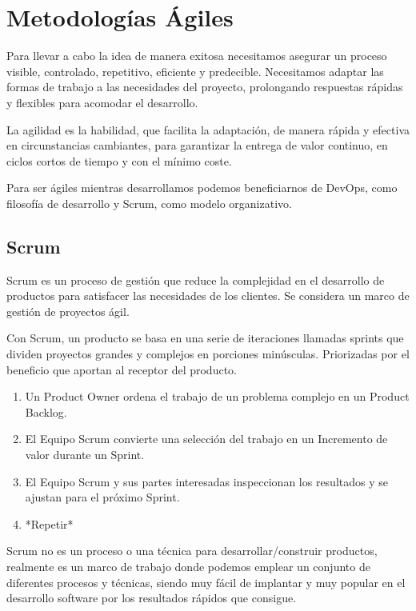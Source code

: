 \documentclass[12pt,twoside,titlepage]{report}
\begin{document}
\section{Metodologías Ágiles}

Para llevar a cabo la idea de manera exitosa necesitamos asegurar un proceso visible, controlado, repetitivo, eficiente y predecible. Necesitamos adaptar las formas de trabajo a las necesidades del proyecto, prolongando respuestas rápidas y flexibles para acomodar el desarrollo.

La agilidad es la habilidad, que facilita la adaptación, de manera rápida y efectiva en circunstancias cambiantes, para garantizar la entrega de valor continuo, en ciclos cortos de tiempo y con el mínimo coste.

Para ser ágiles mientras desarrollamos podemos beneficiarnos de DevOps, como filosofía de desarrollo y Scrum, como modelo organizativo.

\subsection{Scrum}

Scrum es un proceso de gestión que reduce la complejidad en el desarrollo de productos para satisfacer las necesidades de los clientes. Se considera un marco de gestión de proyectos ágil.

Con Scrum, un producto se basa en una serie de iteraciones llamadas sprints que dividen proyectos grandes y complejos en porciones minúsculas. Priorizadas por el beneficio que aportan al receptor del producto.

\begin{enumerate}
    \item Un Product Owner ordena el trabajo de un problema complejo en un Product Backlog.
    \item El Equipo Scrum convierte una selección del trabajo en un Incremento de valor durante un Sprint.
    \item El Equipo Scrum y sus partes interesadas inspeccionan los resultados y se ajustan para el próximo Sprint.
    \item *Repetir*
\end{enumerate}

Scrum no es un proceso o una técnica para desarrollar/construir productos, realmente es un marco de trabajo donde podemos emplear un conjunto de diferentes procesos y técnicas, siendo muy fácil de implantar y muy popular en el desarrollo software por los resultados rápidos que consigue.
\end{document}
